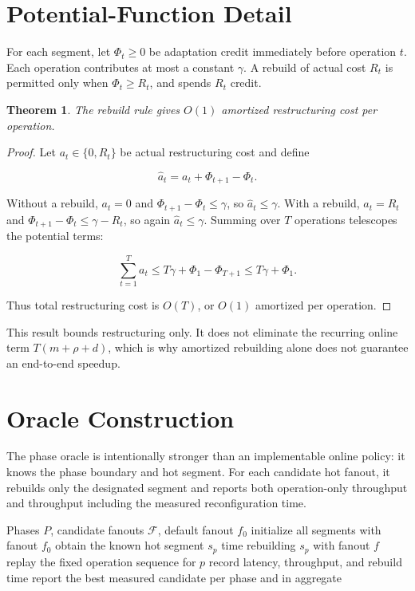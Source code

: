 \documentclass[sigconf,review,anonymous]{acmart}
\newtheorem{theorem}{Theorem}
\begin{document}
\section{Potential-Function Detail}

For each segment, let $\Phi_t\ge0$ be adaptation credit immediately before
operation $t$.  Each operation contributes at most a constant $\gamma$.
A rebuild of actual cost $R_t$ is permitted only when $\Phi_t\ge R_t$, and
spends $R_t$ credit.

\begin{theorem}
The rebuild rule gives $O(1)$ amortized restructuring cost per operation.
\end{theorem}

\begin{proof}
Let $a_t\in\{0,R_t\}$ be actual restructuring cost and define

\[
  \widehat a_t=a_t+\Phi_{t+1}-\Phi_t.
\]

Without a rebuild, $a_t=0$ and
$\Phi_{t+1}-\Phi_t\le\gamma$, so
$\widehat a_t\le\gamma$.  With a rebuild,
$a_t=R_t$ and
$\Phi_{t+1}-\Phi_t\le\gamma-R_t$, so again
$\widehat a_t\le\gamma$.  Summing over $T$ operations telescopes the
potential terms:

\[
  \sum_{t=1}^{T}a_t
  \le T\gamma+\Phi_1-\Phi_{T+1}
  \le T\gamma+\Phi_1.
\]

Thus total restructuring cost is $O(T)$, or $O(1)$ amortized per
operation.
\end{proof}

This result bounds restructuring only.  It does not eliminate the recurring
online term $T(m+\rho+d)$, which is why amortized rebuilding alone does not
guarantee an end-to-end speedup.

\section{Oracle Construction}

The phase oracle is intentionally stronger than an implementable online
policy: it knows the phase boundary and hot segment.  For each candidate hot
fanout, it rebuilds only the designated segment and reports both operation-only
throughput and throughput including the measured reconfiguration time.

\begin{algorithm}[t]
\caption{Phase-aware fanout oracle}
\begin{algorithmic}[1]
\Require Phases $P$, candidate fanouts $\mathcal F$, default fanout $f_0$
  \State initialize all segments with fanout $f_0$
    \State obtain the known hot segment $s_p$
    \State time rebuilding $s_p$ with fanout $f$
    \State replay the fixed operation sequence for $p$
    \State record latency, throughput, and rebuild time
  \EndFor
\EndFor
\State report the best measured candidate per phase and in aggregate
\end{algorithmic}
\end{algorithm}
\end{document}

